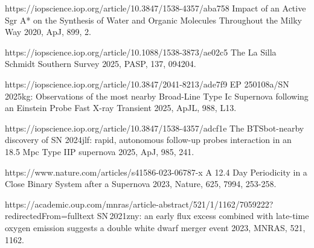 \begin{cvpubs}
\begin{cvpubitems}
{}
{https://iopscience.iop.org/article/10.3847/1538-4357/aba758}
{Impact of an Active Sgr A* on the Synthesis of Water and Organic Molecules Throughout the Milky Way}
{2020, ApJ, 899, 2.}


{\Cliu}
{https://iopscience.iop.org/article/10.1088/1538-3873/ae02c5}
{The La Silla Schmidt Southern Survey}
{2025, PASP, 137, 094204.}

{\Cliu}
{https://iopscience.iop.org/article/10.3847/2041-8213/ade7f9}
{EP 250108a/SN 2025kg: Observations of the most nearby Broad-Line Type Ic Supernova following an Einstein Probe Fast X-ray Transient}
{2025, ApJL, 988, L13.}

{\Cliu}
{https://iopscience.iop.org/article/10.3847/1538-4357/adcf1e}
{The BTSbot-nearby discovery of SN 2024jlf: rapid, autonomous follow-up probes interaction in an 18.5 Mpc Type IIP supernova}
{2025, ApJ, 985, 241.}

{\Cliu}
{https://www.nature.com/articles/s41586-023-06787-x}
{A 12.4 Day Periodicity in a Close Binary System after a Supernova}
{2023, Nature, 625, 7994, 253-258.}

{\Cliu}
{https://academic.oup.com/mnras/article-abstract/521/1/1162/7059222?redirectedFrom=fulltext}
{SN\,2021zny: an early flux excess combined with late-time oxygen emission suggests a double white dwarf merger event}
{2023, MNRAS, 521, 1162.}

\end{cvpubitems}


\end{cvpubs}





